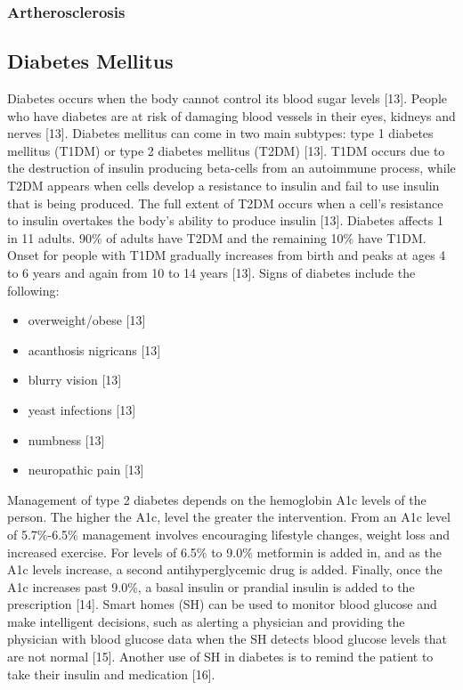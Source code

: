 \subsubsection{Artherosclerosis}

\subsection{Diabetes Mellitus}
Diabetes occurs when the body cannot control its blood sugar levels [13]. People who have diabetes are at risk of damaging blood vessels in their eyes, kidneys and nerves [13]. Diabetes mellitus can come in two main subtypes: type 1 diabetes mellitus (T1DM) or type 2 diabetes mellitus (T2DM) [13]. T1DM occurs due to the destruction of insulin producing beta-cells from an autoimmune process, while T2DM appears when cells develop a resistance to insulin and fail to use insulin that is being produced. The full extent of T2DM occurs when a cell’s resistance to insulin overtakes the body’s ability to produce insulin [13]. Diabetes affects 1 in 11 adults. 90\% of adults have T2DM and the remaining 10\% have T1DM. Onset for people with T1DM gradually increases from birth and peaks at ages 4 to 6 years and again from 10 to 14 years [13]. 
Signs of diabetes include the following:
\begin{itemize}
    \item overweight/obese [13]
    \item acanthosis nigricans [13]
    \item blurry vision [13]
    \item yeast infections [13]
    \item numbness [13]
    \item neuropathic pain [13]
\end{itemize}
Management of type 2 diabetes depends on the hemoglobin A1c levels of the person. The higher the A1c, level the greater the intervention. From an A1c level of 5.7\%-6.5\% management involves encouraging lifestyle changes, weight loss and increased exercise. For levels of 6.5\% to 9.0\% metformin is added in, and as the A1c levels increase, a second antihyperglycemic drug is added. Finally, once the A1c increases past 9.0\%, a basal insulin or prandial insulin is added to the prescription [14].
Smart homes (SH) can be used to monitor blood glucose and make intelligent decisions, such as alerting a physician and providing the physician with blood glucose data when the SH detects blood glucose levels that are not normal [15]. Another use of SH in diabetes is to remind the patient to take their insulin and medication [16].


